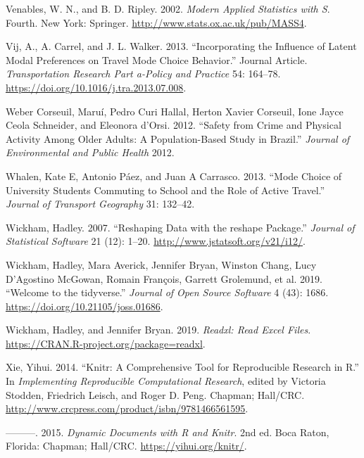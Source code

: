 \documentclass[]{elsarticle} %
\begin{document}
\leavevmode\hypertarget{ref-Venables2002modern}{}%
Venables, W. N., and B. D. Ripley. 2002. \emph{Modern Applied Statistics
with S}. Fourth. New York: Springer.
\url{http://www.stats.ox.ac.uk/pub/MASS4}.

\leavevmode\hypertarget{ref-Vij2013incorporating}{}%
Vij, A., A. Carrel, and J. L. Walker. 2013. ``Incorporating the
Influence of Latent Modal Preferences on Travel Mode Choice Behavior.''
Journal Article. \emph{Transportation Research Part a-Policy and
Practice} 54: 164--78. \url{https://doi.org/10.1016/j.tra.2013.07.008}.

\leavevmode\hypertarget{ref-weber2012safety}{}%
Weber Corseuil, Maruí, Pedro Curi Hallal, Herton Xavier Corseuil, Ione
Jayce Ceola Schneider, and Eleonora d'Orsi. 2012. ``Safety from Crime
and Physical Activity Among Older Adults: A Population-Based Study in
Brazil.'' \emph{Journal of Environmental and Public Health} 2012.

\leavevmode\hypertarget{ref-whalen2013mode}{}%
Whalen, Kate E, Antonio Páez, and Juan A Carrasco. 2013. ``Mode Choice
of University Students Commuting to School and the Role of Active
Travel.'' \emph{Journal of Transport Geography} 31: 132--42.

\leavevmode\hypertarget{ref-Wickham2007reshaping}{}%
Wickham, Hadley. 2007. ``Reshaping Data with the reshape Package.''
\emph{Journal of Statistical Software} 21 (12): 1--20.
\url{http://www.jstatsoft.org/v21/i12/}.

\leavevmode\hypertarget{ref-Wickham2019welcome}{}%
Wickham, Hadley, Mara Averick, Jennifer Bryan, Winston Chang, Lucy
D'Agostino McGowan, Romain François, Garrett Grolemund, et al. 2019.
``Welcome to the tidyverse.'' \emph{Journal of Open Source Software} 4
(43): 1686. \url{https://doi.org/10.21105/joss.01686}.

\leavevmode\hypertarget{ref-Wickham2019readxl}{}%
Wickham, Hadley, and Jennifer Bryan. 2019. \emph{Readxl: Read Excel
Files}. \url{https://CRAN.R-project.org/package=readxl}.

\leavevmode\hypertarget{ref-Xie2014knitr}{}%
Xie, Yihui. 2014. ``Knitr: A Comprehensive Tool for Reproducible
Research in R.'' In \emph{Implementing Reproducible Computational
Research}, edited by Victoria Stodden, Friedrich Leisch, and Roger D.
Peng. Chapman; Hall/CRC.
\url{http://www.crcpress.com/product/isbn/9781466561595}.

\leavevmode\hypertarget{ref-Xie2015dynamic}{}%
---------. 2015. \emph{Dynamic Documents with R and Knitr}. 2nd ed. Boca
Raton, Florida: Chapman; Hall/CRC. \url{https://yihui.org/knitr/}.
\end{document}
